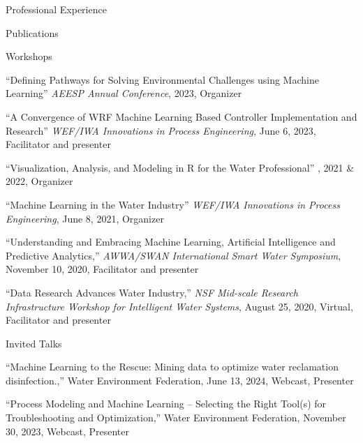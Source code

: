 \documentclass{resume} %
\begin{document}
\begin{rSection}{Professional Experience}
\begin{rSection}{Publications}
\end{rSection}






\begin{rSection}{Workshops}

``Defining Pathways for Solving Environmental Challenges using Machine Learning'' \emph{AEESP Annual Conference}, 2023, Organizer

``A Convergence of WRF Machine Learning Based Controller Implementation and Research'' \emph{WEF/IWA Innovations in Process Engineering}, June 6, 2023, Facilitator and presenter

``Visualization, Analysis, and Modeling in R for the Water Professional'' , 2021 \& 2022, Organizer

``Machine Learning in the Water Industry'' \emph{WEF/IWA Innovations in Process Engineering}, June 8, 2021, Organizer

``Understanding and Embracing Machine Learning, Artificial Intelligence and Predictive Analytics,'' \emph{AWWA/SWAN International Smart Water Symposium}, November 10, 2020, Facilitator and presenter

``Data Research Advances Water Industry,'' \emph{NSF Mid-scale Research Infrastructure Workshop for Intelligent Water Systems}, August 25, 2020, Virtual, Facilitator and presenter

\end{rSection}





\begin{rSection}{Invited Talks}

``Machine Learning to the Rescue: Mining data to optimize water reclamation disinfection.,'' Water Environment Federation, June 13, 2024, Webcast, Presenter

``Process Modeling and Machine Learning – Selecting the Right Tool(s) for Troubleshooting and Optimization,'' Water Environment Federation, November 30, 2023, Webcast, Presenter


\end{rSection}
\end{rSection}
\end{document}
